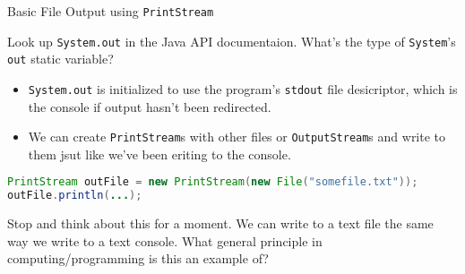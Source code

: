 \documentclass{beamer}
\begin{document}
\begin{frame}[fragile]{Basic File Output using {\tt PrintStream}}

Look up {\tt System.out} in the Java API documentaion.  What's the type of {\tt System}'s {\tt out} static variable?\\

\begin{itemize}
\item {\tt System.out} is initialized to use the program's {\tt stdout} file desicriptor, which is the console if output hasn't been redirected.
\item We can create {\tt PrintStream}s with other files or {\tt OutputStream}s and write to them jsut like we've been eriting to the console.
\end{itemize}

\begin{lstlisting}[language=Java]
PrintStream outFile = new PrintStream(new File("somefile.txt"));
outFile.println(...);
\end{lstlisting}

Stop and think about this for a moment.  We can write to a text file the same way we write to a text console.  What general principle in computing/programming is this an example of?

\end{frame}
\end{document}

